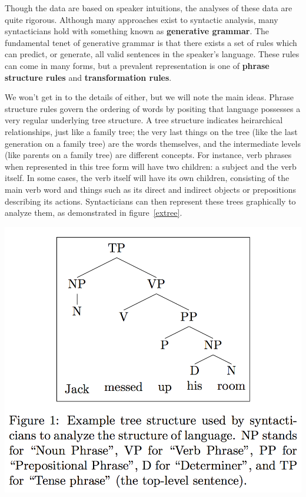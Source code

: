 \documentclass[twocolumn]{article}
\begin{document}
Though the data are based on speaker intuitions, the analyses of these data are quite rigorous.
Although many approaches exist to syntactic analysis, many syntacticians hold with something known
as \textbf{generative grammar}. The fundamental tenet of generative grammar is that there exists a
set of rules which can predict, or generate, all valid sentences in the speaker's language. These
rules can come in many forms, but a prevalent representation is one of \textbf{phrase structure
rules} and \textbf{transformation rules}. 

We won't get in to the details of either, but we will note
the main ideas. Phrase structure rules govern the ordering of words by positing that language
possesses a very regular underlying tree structure. A tree structure indicates heirarchical
relationships, just like a family tree; the very last things on the tree (like the last generation
on a family tree) are the words themselves, and the intermediate levels (like parents on a family
tree) are different concepts.  For instance, verb phrases when represented in this tree form will
have two children: a subject and the verb itself. In some cases, the verb itself will have its own
children, consisting of the main verb word and things such as its direct and indirect objects or
prepositions describing its actions. Syntacticians can then represent these trees graphically to
analyze them, as demonstrated in figure~\ref{extree}.

\begin{center}
    \includegraphics[scale=0.5]{images/sample-tree.png}
\end{center}
\end{document}
